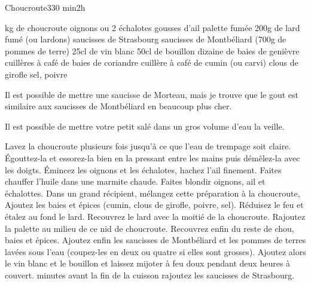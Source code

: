 \begin{recette}{Choucroute}{3}{30 min}{2h}
\begin{ingredients}[6 pers.]
 kg de choucroute
 oignons
 ou 2 échalotes
 gousses d'ail
 palette fumée
\ingredient 200g de lard fumé (ou lardons)
 saucisses de Strasbourg
 saucisses de Montbéliard
\ingredient (700g de pommes de terre)
\ingredient 25cl de vin blanc
\ingredient 50cl de bouillon
 dizaine de baies de genièvre
 cuillères à café de baies de coriandre
 cuillère à café de cumin (ou carvi)
 clous de girofle
\ingredient sel, poivre
\begin{remarque}
Il est possible de mettre une saucisse de Morteau, mais je trouve que le gout est similaire aux saucisses de Montbéliard en beaucoup plus cher.
\end{remarque}

\end{ingredients}
\begin{remarque}
Il est possible de mettre votre petit salé dans un gros volume d'eau la veille.
\end{remarque}
\begin{preparation}
\etape Lavez la choucroute plusieurs fois jusqu'à ce que l'eau de trempage soit claire. Égouttez-la et essorez-la bien en la pressant entre les mains puis démêlez-la avec les doigts.
\etape Émincez les oignons et les échalotes, hachez l'ail finement. 
\etape Faites chauffer l'huile dans une marmite chaude. Faites blondir oignons, ail et échalottes.
\etape Dans un grand récipient, mélangez cette préparation à la choucroute, Ajoutez les baies et épices (cumin, clous de girofle, poivre, sel). 
\etape Réduisez le feu et étalez au fond le lard. Recouvrez le lard avec la moitié de la choucroute. Rajoutez la palette au milieu de ce nid de choucroute. Recouvrez enfin du reste de chou, baies et épices. Ajoutez enfin les saucisses de Montbéliard et les pommes de terres lavées sous l'eau (coupez-les en deux ou quatre si elles sont grosses).
\etape Ajoutez alors le vin blanc et le bouillon et laissez mijoter à feu doux pendant deux heures à couvert. 
 minutes avant la fin de la cuisson rajoutez les saucisses de Strasbourg.
\end{preparation}
\end{recette}

